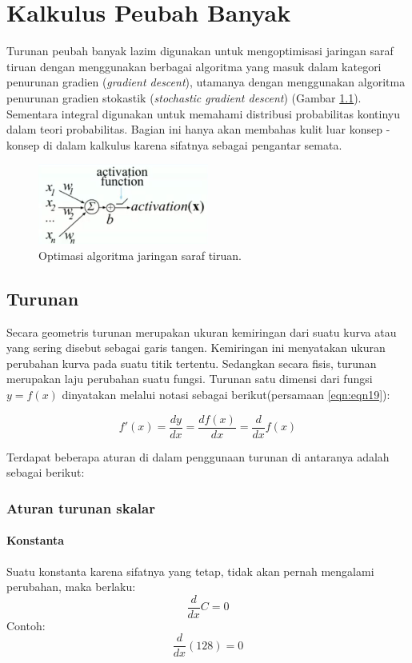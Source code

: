 \chapter{Kalkulus Peubah Banyak}
Turunan peubah banyak lazim digunakan untuk mengoptimisasi jaringan saraf tiruan dengan menggunakan berbagai algoritma yang masuk dalam kategori penurunan gradien (\textit{gradient descent}), utamanya dengan menggunakan algoritma penurunan gradien stokastik (\textit{stochastic gradient descent}) (Gambar \ref{fig:fig4}). Sementara integral digunakan untuk memahami distribusi probabilitas kontinyu dalam teori probabilitas. Bagian ini hanya akan membahas kulit luar konsep - konsep di dalam kalkulus karena sifatnya sebagai pengantar semata.

\begin{figure}[H]
    \centering
    \includegraphics[width=0.5\textwidth]{gambar/gmb4.png}
    \caption{Optimasi algoritma jaringan saraf tiruan.}
    \label{fig:fig4}
\end{figure}

\section{Turunan}
Secara geometris turunan merupakan ukuran kemiringan dari suatu kurva atau yang sering disebut sebagai garis tangen. Kemiringan ini menyatakan ukuran perubahan kurva pada suatu titik tertentu. Sedangkan secara fisis, turunan merupakan laju perubahan suatu fungsi. Turunan satu dimensi dari fungsi $y=f(x)$ dinyatakan melalui notasi sebagai berikut(persamaan \ref{eqn:eqn19}):

\begin{dmath}\label{eqn:eqn19}
f'(x) = \frac{dy}{dx} = \frac{df(x)}{dx} = \frac{d}{dx}f(x)
\end{dmath}

Terdapat beberapa aturan di dalam penggunaan turunan di antaranya adalah sebagai berikut:
\subsection{Aturan turunan skalar}

\subsubsection{Konstanta}
Suatu konstanta karena sifatnya yang tetap, tidak akan pernah mengalami perubahan, maka berlaku:
\begin{equation}\label{eqn:eqn20}
    \frac{d}{dx} C = 0
\end{equation}
Contoh:
\begin{equation*}
    \frac{d}{dx}(128) = 0
\end{equation*}

